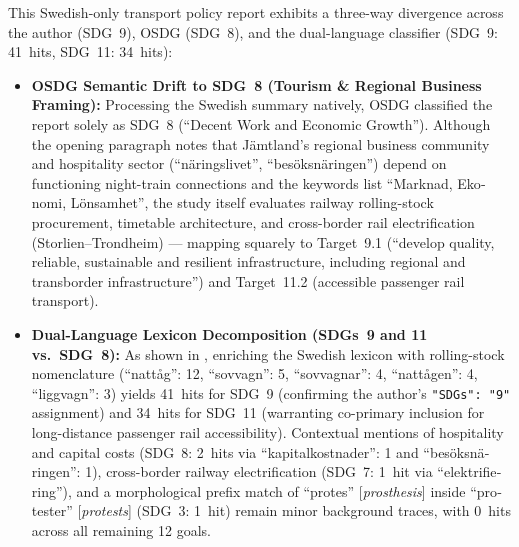 \begin{casestudySection}
This Swedish-only transport policy report exhibits a three-way divergence across the author (\gls{SDG}~9), OSDG (\gls{SDG}~8), and the dual-language classifier (\gls{SDG}~9: \num{41}~hits, \gls{SDG}~11: \num{34}~hits):
\begin{itemize}
    \item \textbf{OSDG Semantic Drift to \gls{SDG}~8 (Tourism \& Regional Business Framing):} Processing the Swedish summary natively, OSDG classified the report solely as \gls{SDG}~8 (\enquote{Decent Work and Economic Growth}). Although the opening paragraph notes that Jämtland's regional business community and hospitality sector (\enquote{\foreignlanguage{swedish}{näringslivet}}, \enquote{\foreignlanguage{swedish}{besöksnäringen}}) depend on functioning night-train connections and the keywords list \enquote{\foreignlanguage{swedish}{Marknad, Ekonomi, Lönsamhet}}, the study itself evaluates railway rolling-stock procurement, timetable architecture, and cross-border rail electrification (Storlien--Trondheim) --- mapping squarely to Target~9.1 (\enquote{develop quality, reliable, sustainable and resilient infrastructure, including regional and transborder infrastructure}) and Target~11.2 (accessible passenger rail transport).

    \item \textbf{Dual-Language Lexicon Decomposition (\glspl{SDG}~9 and 11 vs.\ \gls{SDG}~8):} As shown in , enriching the Swedish lexicon with rolling-stock nomenclature (\enquote{\foreignlanguage{swedish}{nattåg}}: 12, \enquote{\foreignlanguage{swedish}{sovvagn}}: 5, \enquote{\foreignlanguage{swedish}{sovvagnar}}: 4, \enquote{\foreignlanguage{swedish}{nattågen}}: 4, \enquote{\foreignlanguage{swedish}{liggvagn}}: 3) yields \num{41}~hits for \gls{SDG}~9 (confirming the author's \texttt{"SDGs": "9"} assignment) and \num{34}~hits for \gls{SDG}~11 (warranting co-primary inclusion for long-distance passenger rail accessibility). Contextual mentions of hospitality and capital costs (\gls{SDG}~8: \num{2}~hits via \enquote{\foreignlanguage{swedish}{kapitalkostnader}}: 1 and \enquote{\foreignlanguage{swedish}{besöksnäringen}}: 1), cross-border railway electrification (\gls{SDG}~7: \num{1}~hit via \enquote{\foreignlanguage{swedish}{elektrifiering}}), and a morphological prefix match of \enquote{\foreignlanguage{swedish}{protes}} [\emph{prosthesis}] inside \enquote{\foreignlanguage{swedish}{protester}} [\emph{protests}] (\gls{SDG}~3: \num{1}~hit) remain minor background traces, with \num{0}~hits across all remaining \num{12} goals.
\end{itemize}
\end{casestudySection}

